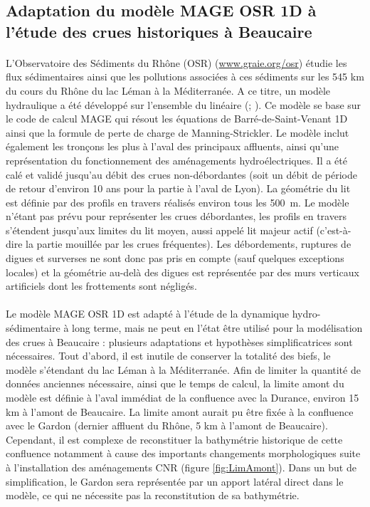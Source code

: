 	\FloatBarrier
	 \subsection{Adaptation du modèle MAGE OSR 1D à l'étude des crues historiques à Beaucaire}
	 
	 \paragraph{} L'Observatoire des Sédiments du Rhône (OSR) (\url{www.graie.org/osr}) étudie les flux sédimentaires ainsi que les pollutions associées à ces sédiments sur les 545 km du cours du Rhône du lac Léman à la Méditerranée. A ce titre, un modèle hydraulique a été développé sur l'ensemble du linéaire (\cite{dugue_accounting_2015}; \cite{launay_numerical_2019}). Ce modèle se base sur le code de calcul MAGE \citep{souhar_approach_2009} qui résout les équations de Barré-de-Saint-Venant 1D ainsi que la formule de perte de charge de Manning-Strickler. Le modèle inclut également les tronçons les plus à l'aval des principaux affluents, ainsi qu'une représentation du fonctionnement des aménagements hydroélectriques. Il a été calé et validé jusqu'au débit des crues non-débordantes (soit un débit de période de retour d'environ 10 ans pour la partie à l'aval de Lyon). La géométrie du lit est définie par des profils en travers réalisés environ tous les 500~m. Le modèle n'étant pas prévu pour représenter les crues débordantes, les profils en travers s'étendent jusqu'aux limites du lit moyen, aussi appelé lit majeur actif (c'est-à-dire la partie mouillée par les crues fréquentes). Les débordements, ruptures de digues et surverses ne sont donc pas pris en compte (sauf quelques exceptions locales) et la géométrie au-delà des digues est représentée par des murs verticaux artificiels dont les frottements sont négligés. 
	 
	 \paragraph{} Le modèle MAGE OSR 1D est adapté à l'étude de la dynamique hydro-sédimentaire à long terme, mais ne peut en l'état être utilisé pour la modélisation des crues à Beaucaire : plusieurs adaptations et hypothèses simplificatrices sont nécessaires. Tout d'abord, il est inutile de conserver la totalité des biefs, le modèle s'étendant du lac Léman à la Méditerranée. Afin de limiter la quantité de données anciennes nécessaire, ainsi que le temps de calcul, la limite amont du modèle est définie à l'aval immédiat de la confluence avec la Durance, environ 15 km à l'amont de Beaucaire. La limite amont aurait pu être fixée à la confluence avec le Gardon (dernier affluent du Rhône, 5 km à l'amont de Beaucaire). Cependant, il est complexe de reconstituer la bathymétrie historique de cette confluence notamment à cause des importants changements morphologiques suite à l'installation des aménagements CNR (figure \ref{fig:LimAmont}). Dans un but de simplification, le Gardon sera représentée par un apport latéral direct dans le modèle, ce qui ne nécessite pas la reconstitution de sa bathymétrie. 
	 
